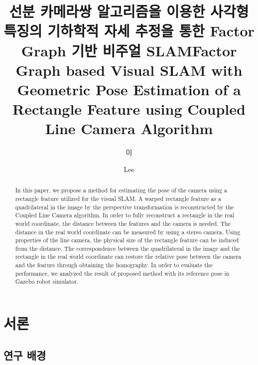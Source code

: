 \documentclass[master,korean,final]{cbnu-ecs}
\title[korean]{선분 카메라쌍 알고리즘을 이용한 사각형 특징의 기하학적 자세 추정을 통한 Factor Graph 기반 비주얼 SLAM}
\title[english]{Factor Graph based Visual SLAM with Geometric Pose Estimation of a Rectangle Feature using Coupled Line Camera Algorithm}
\author[korean] {이}{재 민}
\author[english]{Lee}{Jae-Min}
\begin{document}
\tableofcontents
\listoffigures
\listoftables
\begin{abstract}
In this paper, we propose a method for estimating the pose of the camera using a rectangle feature utilized for the  visual SLAM.  A warped rectangle feature as a quadrilateral in the image by the perspective transformation is reconstructed by the Coupled Line Camera algorithm. In order to fully reconstruct a rectangle in the real world coordinate, the distance between the features and the camera is needed. The distance in the real world coordinate can be measured by using a stereo camera. Using properties of the line camera, the physical size of the rectangle  feature can be induced from the distance. The correspondence between the quadrilateral in the image and the rectangle in the real world coordinate can restore the relative pose between the camera and the feature through obtaining the homography. In order to evaluate the performance, we analyzed the result of proposed method with its reference pose in Gazebo robot simulator.
\end{abstract}



\chapter{서론}
\section{연구 배경}
\end{document}
